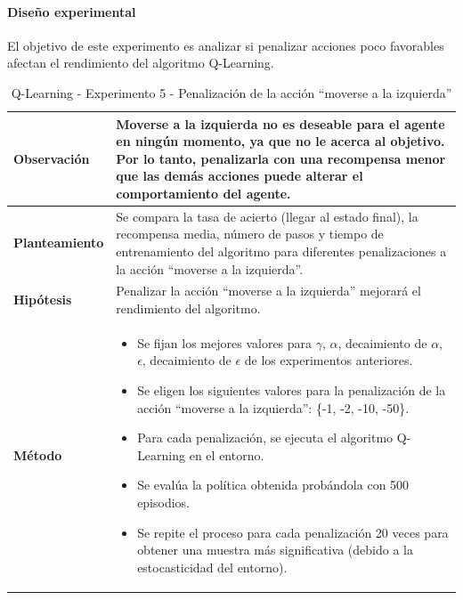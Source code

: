 \paragraph{Diseño experimental}
El objetivo de este experimento es analizar si penalizar acciones poco favorables afectan el rendimiento del algoritmo Q-Learning.
\begin{table}[H]
    \centering
    \begin{tabularx}{\textwidth}{|p{4cm}|X|} %
        \hline %
        \textbf{Observación} & Moverse a la izquierda no es deseable para el agente en ningún momento, ya que no le acerca al objetivo. Por lo tanto, penalizarla con una recompensa menor que las demás acciones puede alterar el comportamiento del agente.
        \\ \hline 
        \textbf{Planteamiento} & Se compara la tasa de acierto (llegar al estado final), la recompensa media, número de pasos y tiempo de entrenamiento del algoritmo para diferentes penalizaciones a la acción ``moverse a la izquierda''.
        \\ \hline
        \textbf{Hipótesis} & Penalizar la acción ``moverse a la izquierda'' mejorará el rendimiento del algoritmo.
        \\ \hline
        \textbf{Método} &
        \begin{itemize}
            \item Se fijan los mejores valores para \(\gamma\), \(\alpha\), decaimiento de \(\alpha\), \(\epsilon\), decaimiento de \(\epsilon\) de los experimentos anteriores.
            \item Se eligen los siguientes valores para la penalización de la acción ``moverse a la izquierda'': \{-1, -2, -10, -50\}.
            \item Para cada penalización, se ejecuta el algoritmo Q-Learning en el entorno.
            \item Se evalúa la política obtenida probándola con 500 episodios.
            \item Se repite el proceso para cada penalización 20 veces para obtener una muestra más significativa (debido a la estocasticidad del entorno).
        \end{itemize}
        \\ \hline
    \end{tabularx}
    \caption{Q-Learning - Experimento 5 - Penalización de la acción ``moverse a la izquierda''}
    \label{tab:diseñoQLEarningExp4}
\end{table}

